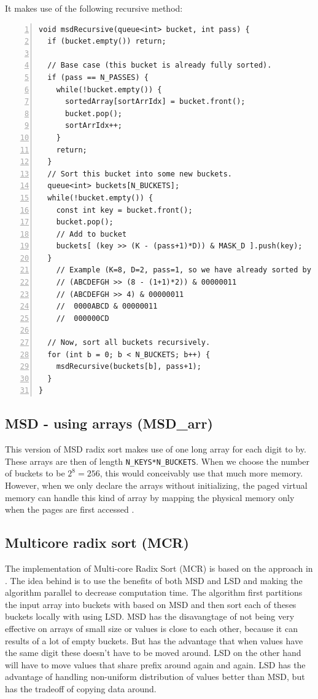 It makes use of the following recursive method:
\begin{lstlisting}[numbers=left]
void msdRecursive(queue<int> bucket, int pass) {
  if (bucket.empty()) return;
  
  // Base case (this bucket is already fully sorted).
  if (pass == N_PASSES) {
    while(!bucket.empty()) {
      sortedArray[sortArrIdx] = bucket.front();
      bucket.pop();
      sortArrIdx++;
    }
    return;
  }
  // Sort this bucket into some new buckets.
  queue<int> buckets[N_BUCKETS];
  while(!bucket.empty()) {
    const int key = bucket.front();
    bucket.pop();
    // Add to bucket
    buckets[ (key >> (K - (pass+1)*D)) & MASK_D ].push(key);
  }
    // Example (K=8, D=2, pass=1, so we have already sorted by AB, and now we look at CD):
    // (ABCDEFGH >> (8 - (1+1)*2)) & 00000011
    // (ABCDEFGH >> 4) & 00000011
    //  0000ABCD & 00000011
    //  000000CD

  // Now, sort all buckets recursively.
  for (int b = 0; b < N_BUCKETS; b++) {
    msdRecursive(buckets[b], pass+1);
  }
}
\end{lstlisting}

\subsection{MSD - using arrays (MSD\_arr)}
This version of MSD radix sort makes use of one long array for each digit to by.
These arrays are then of length \verb!N_KEYS*N_BUCKETS!. When we choose the number of buckets to be $2^8=256$, this would conceivably use that much more memory.
However, when we only declare the arrays without initializing, the paged virtual memory can handle this kind of array by mapping the physical memory only when the pages are first accessed \citep{radixSort}.


\subsection{Multicore radix sort (MCR)}
The implementation of Multi-core Radix Sort (MCR) is based on the approach in \citep{radixSort}. The idea behind is to use the benefits of both MSD and LSD and making the algorithm parallel to decrease computation time. 
The algorithm first partitions the input array into buckets with based on MSD and then sort each of theses buckets locally with using LSD.  
MSD has the disavangtage of not being very effective on arrays of small size or values is close to each other, because it can results of a lot of empty buckets. 
But has the advantage that when values have the same digit these doesn't have to be moved around. LSD on the other hand will have to move values that share prefix around again and again.
LSD has the advantage of handling non-uniform distribution of values better than MSD, but has the tradeoff of copying data around.  

